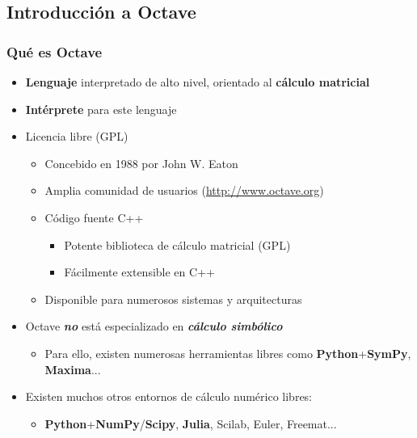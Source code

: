 
\subsection{Introducción a Octave}


\hypertarget{qu-es-octave-i}{}
\begin{frame}\frametitle{Qué es Octave}
\begin{itemize}
\item {} 
  \textbf{Lenguaje} interpretado de alto nivel, orientado al \textbf{cálculo matricial}

\item {} 
  \textbf{Intérprete} para este lenguaje

\item {} 
Licencia libre (GPL)
\begin{itemize}
\item {} 
Concebido en 1988 por John W. Eaton

\item {} 
Amplia comunidad de usuarios (\href{http://www.octave.org}{http://www.octave.org})

\item {} 
Código fuente C++
\begin{itemize}
\item {} 
Potente biblioteca de cálculo matricial (GPL)

\item {} 
Fácilmente extensible en C++

\end{itemize}

\item {} 
Disponible para numerosos sistemas y arquitecturas

\end{itemize}


\item Octave \emph{\bf no} está especializado en \emph{\bf cálculo simbólico}
    \begin{itemize}
    \item {} Para ello, existen numerosas herramientas libres como
       \textbf{Python}+\textbf{SymPy}, \textbf{Maxima}... 
    \end{itemize}
    
\item 
    Existen muchos otros entornos de cálculo numérico libres:
    \begin{itemize}
      \item {} \textbf{Python}+\textbf{NumPy}/\textbf{Scipy}, \textbf{Julia}, Scilab, Euler, Freemat...    
    \end{itemize}
    
\end{itemize}

\end{frame}


